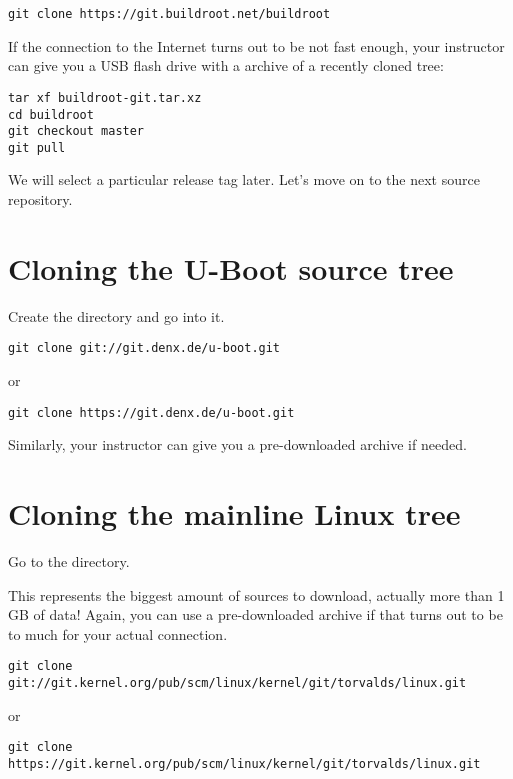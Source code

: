 \begin{verbatim}
git clone https://git.buildroot.net/buildroot
\end{verbatim}

If the connection to the Internet turns out to be not fast enough,
your instructor can give you a USB flash drive with a
 archive of a recently cloned tree:

\begin{verbatim}
tar xf buildroot-git.tar.xz
cd buildroot
git checkout master
git pull
\end{verbatim}

We will select a particular release tag later. Let's move on to the next
source repository.

\section{Cloning the U-Boot source tree}

Create the  directory and go
into it.

\begin{verbatim}
git clone git://git.denx.de/u-boot.git
\end{verbatim}

or

\begin{verbatim}
git clone https://git.denx.de/u-boot.git
\end{verbatim}

Similarly, your instructor can give you a pre-downloaded archive if
needed.

\section{Cloning the mainline Linux tree}

Go to the  directory.

This represents the biggest amount of sources to download, actually more
than 1 GB of data! Again, you can use a pre-downloaded archive if that
turns out to be to much for your actual connection.

\begin{verbatim}
git clone git://git.kernel.org/pub/scm/linux/kernel/git/torvalds/linux.git
\end{verbatim}

or

\begin{verbatim}
git clone https://git.kernel.org/pub/scm/linux/kernel/git/torvalds/linux.git
\end{verbatim}

